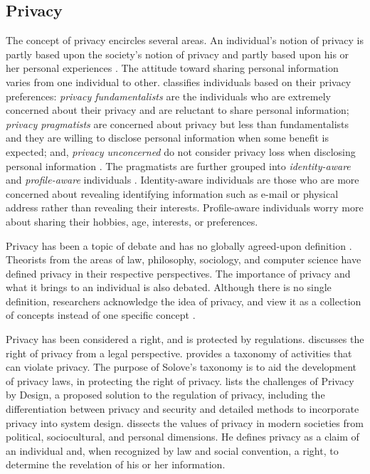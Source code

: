 \subsection{Privacy}
The concept of privacy encircles several areas. An individual's notion of
privacy is partly based upon the society's notion of privacy and partly
based upon his or her personal experiences \citep{westin1967privacy,
westin2003social}. The attitude toward sharing personal
information varies from one individual to other.
\citet{westin1967privacy} classifies individuals based on their privacy
preferences: \textit{privacy fundamentalists} are the individuals who
are extremely concerned about their privacy and are reluctant to share
personal information; \textit{privacy pragmatists} are concerned about
privacy but less than fundamentalists and they are willing to disclose
personal information when some benefit is expected; and,
\textit{privacy unconcerned} do not consider privacy loss when
disclosing personal information \citep{westin1967privacy}. The
pragmatists are further grouped into \emph{identity-aware} and \emph{profile-aware}
individuals \citep{spiekermann2009enggprivacy}. Identity-aware
individuals are those who are more concerned about revealing
identifying information such as e-mail or physical address rather than
revealing their interests. Profile-aware individuals worry more about
sharing their hobbies, age, interests, or preferences.

Privacy has been a topic of debate and has no globally
agreed-upon definition \citep{smith2007privacy}. Theorists from the
areas of law, philosophy, sociology, and computer science have 
defined privacy in their respective perspectives.
The importance of privacy and what it brings to an individual is also
debated. Although there is no single definition, researchers 
acknowledge the idea of privacy, and view it as a
collection of concepts instead of one specific concept
\citep{smith2007privacy}. 

Privacy has been considered a right, and is protected by regulations. 
\citet{Prosser-60:Privacy} discusses the right of privacy from a legal perspective. 
\citet{solove-2006-taxonomy} provides a taxonomy of activities that can violate privacy. 
The purpose of Solove's taxonomy is to aid the development of privacy laws, in protecting the right of privacy.
\citet{Spiekermann-2012-Challenges+PrivacyDesign} lists the challenges of Privacy by Design, a proposed solution to the regulation of privacy, including the differentiation between privacy and security and detailed methods to incorporate privacy into system design. 
\citet{westin2003social} dissects the values of privacy in modern societies from political, sociocultural, and personal dimensions.
He defines privacy as a claim of an individual and, when recognized by law and social convention, a right, to determine the revelation of his or her information.



